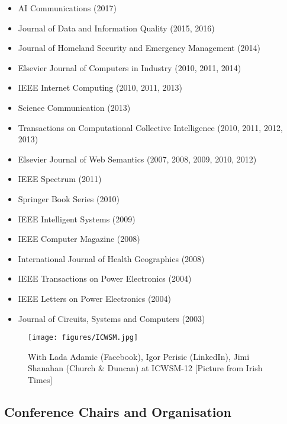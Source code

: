 \documentclass[10pt,a4paper]{res} %
\begin{document}
\begin{resume}
\begin{itemize} \itemsep -2pt
\item AI Communications (2017)
\item Journal of Data and Information Quality (2015, 2016)
\item Journal of Homeland Security and Emergency Management (2014)
\item Elsevier Journal of Computers in Industry (2010, 2011, 2014)
\item IEEE Internet Computing (2010, 2011, 2013)
\item Science Communication (2013)
\item Transactions on Computational Collective Intelligence (2010, 2011, 2012, 2013)
\item Elsevier Journal of Web Semantics (2007, 2008, 2009, 2010, 2012)
\item IEEE Spectrum (2011)
\item Springer Book Series (2010)
\item IEEE Intelligent Systems (2009)
\item IEEE Computer Magazine (2008)
\item International Journal of Health Geographics (2008)
\item IEEE Transactions on Power Electronics (2004)
\item IEEE Letters on Power Electronics (2004)
\item Journal of Circuits, Systems and Computers (2003)
\end{itemize}

\begin{figure}[htbp]
\begin{center}
\texttt{[image: figures/ICWSM.jpg]}
\end{center}
\caption{With Lada Adamic (Facebook), Igor Perisic (LinkedIn), Jimi Shanahan (Church \& Duncan) at ICWSM-12 [Picture from Irish Times]}
\end{figure}

\subsection*{Conference Chairs and Organisation}


\end{resume}
\end{document}
